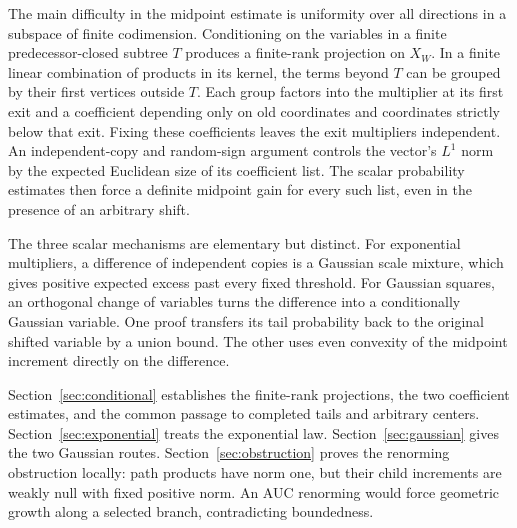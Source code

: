 The main difficulty in the midpoint estimate is uniformity over all
directions in a subspace of finite codimension. Conditioning on the
variables in a finite predecessor-closed subtree $T$ produces a
finite-rank projection on $X_W$. In a finite linear combination of products
in its kernel, the terms beyond $T$ can be grouped by their first vertices
outside $T$. Each group factors into the multiplier at its first exit and
a coefficient depending only on old coordinates and coordinates strictly
below that exit. Fixing these coefficients leaves the exit multipliers
independent.
An independent-copy and random-sign argument controls the vector's
$L^1$ norm by the expected Euclidean size of its coefficient list.
The scalar probability estimates then force a definite midpoint gain
for every such list, even in the presence of an arbitrary shift.

The three scalar mechanisms are elementary but distinct. For exponential
multipliers, a difference of independent copies is a Gaussian scale
mixture, which gives positive expected excess past every fixed threshold.
For Gaussian squares, an orthogonal change of variables turns the
difference into a conditionally Gaussian variable. One proof transfers
its tail probability back to the original shifted variable by a union
bound. The other uses even convexity of the midpoint increment directly
on the difference.

Section~\ref{sec:conditional} establishes the finite-rank projections,
the two coefficient estimates, and the common passage to completed tails
and arbitrary centers. Section~\ref{sec:exponential} treats the exponential
law. Section~\ref{sec:gaussian} gives the two Gaussian routes.
Section~\ref{sec:obstruction} proves the renorming obstruction locally:
path products have norm one, but their child increments are weakly null
with fixed positive norm. An AUC renorming would force geometric growth
along a selected branch, contradicting boundedness.
